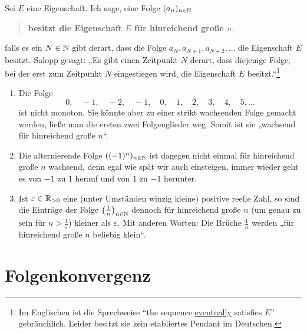 \begin{defin}[``eventually''] \label{def:eventually} 
    Sei $E$ eine Eigenschaft. Ich sage, eine Folge $(a_n)_{n\in \mathbb N}$
    \begin{quote}
        \textbf{besitzt die Eigenschaft $E$ für hinreichend große $n$},
    \end{quote}
    falls es ein $N\in \mathbb N$ gibt derart, dass die Folge $a_N,a_{N+1},a_{N+2},\dots$ die Eigenschaft $E$ besitzt. Salopp gesagt: „Es gibt einen Zeitpunkt $N$ derart, dass diejenige Folge, bei der erst zum Zeitpunkt $N$ eingestiegen wird, die Eigenschaft $E$ besitzt.“\footnote{Im Englischen ist die Sprechweise ``the sequence \href{https://en.wikipedia.org/wiki/Eventually_(mathematics)}{eventually} satisfies $E$'' gebräuchlich. Leider besitzt sie kein etabliertes Pendant im Deutschen.}
\end{defin}


\begin{bsp} \label{bsp:eventually} \quad
    \begin{enumerate}
        \item Die Folge
            \[ 0,\quad -1,\quad -2,\quad -1,\quad 0,\quad 1,\quad 2,\quad 3,\quad 4, \quad 5,\dots \]
        ist nicht monoton. Sie könnte aber zu einer strikt wachsenden Folge gemacht werden, ließe man die ersten zwei Folgenglieder weg. Somit ist sie „wachsend für hinreichend große $n$“.
        \item Die alternierende Folge $((-1)^n)_{n\in \mathbb N}$ ist dagegen nicht einmal für hinreichend große $n$ wachsend, denn egal wie spät wir auch einsteigen, immer wieder geht es von $-1$ zu $1$ herauf und von $1$ zu $-1$ herunter.
        \item Ist $\varepsilon \in \mathbb R_{>0}$ eine (unter Umständen winzig kleine) positive reelle Zahl, so sind die Einträge der Folge $\left(\frac{1}{n}\right)_{n\in \mathbb N}$ dennoch für hinreichend große $n$ (um genau zu sein für $n> \frac{1}{\varepsilon}$) kleiner als $\varepsilon$. Mit anderen Worten: Die Brüche $\frac{1}{n}$ werden „für hinreichend große $n$ beliebig klein“.
    \end{enumerate}
\end{bsp}





\section{Folgenkonvergenz}


